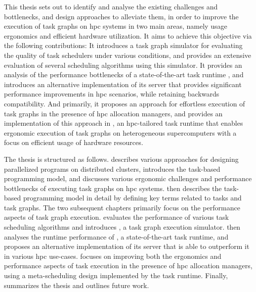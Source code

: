 This thesis sets out to identify and analyse the existing challenges and bottlenecks, and design
approaches to alleviate them, in order to improve the execution of task graphs on
\gls{hpc} systems in two main areas, namely usage ergonomics and efficient hardware
utilization. It aims to achieve this objective via the following contributions: It introduces a
task graph simulator for evaluating the quality of task schedulers under various conditions, and
provides an extensive evaluation of several scheduling algorithms using this simulator. It provides
an analysis of the performance bottlenecks of a state-of-the-art task runtime
\dask{}, and introduces an alternative implementation of its server that provides
significant performance improvements in \gls{hpc} scenarios, while retaining backwards
compatibility. And primarily, it proposes an approach for effortless execution of task graphs in
the presence of \gls{hpc} allocation managers, and provides an implementation of this
approach in \hyperqueue{}, an \gls{hpc}-tailored task runtime that enables
ergonomic execution of task graphs on heterogeneous supercomputers with a focus on efficient usage
of hardware resources.

The thesis is structured as follows.  describes various approaches for
designing parallelized programs on distributed clusters, introduces the task-based programming
model, and discusses various ergonomic challenges and performance bottlenecks of executing task
graphs on \gls{hpc} systems.  then describes the task-based
programming model in detail by defining key terms related to tasks and task graphs. The two
subsequent chapters primarily focus on the performance aspects of task graph execution.
 evaluates the performance of various task scheduling algorithms and
introduces \estee{}, a task graph execution simulator.  then
analyses the runtime performance of \dask{}, a state-of-the-art task runtime, and
proposes an alternative implementation of its server that is able to outperform it in various
\gls{hpc} use-cases.  focuses on improving both the ergonomics
and performance aspects of task execution in the presence of \gls{hpc} allocation
managers, using a meta-scheduling design implemented by the \hyperqueue{} task runtime.
Finally,~ summarizes the thesis and outlines future work.

